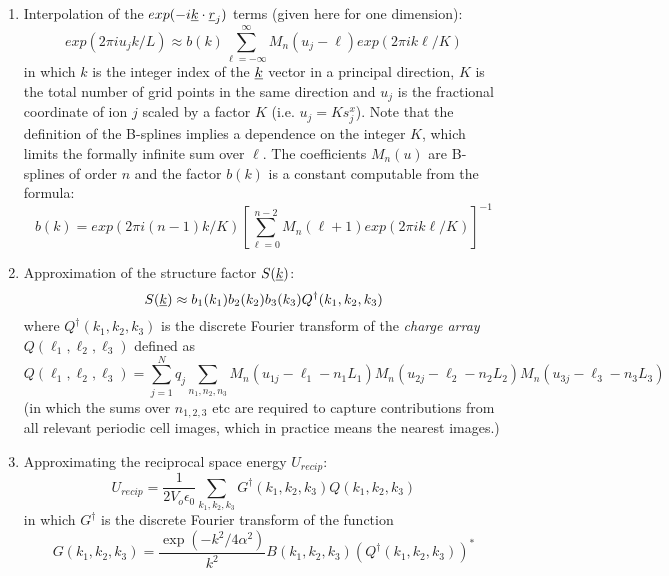 \begin{enumerate}
\item Interpolation of the $exp(-i\mbox{$\underline{k}$}\cdot\mbox{$\underline{r}$}_{j})$ terms
(given here for one dimension):
\begin{equation}
exp(2\pi i u_{j}k/L) \approx b(k)
\sum_{\ell=-\infty}^{\infty} M_{n}(u_{j}-\ell) exp(2\pi i k\ell/K)
\end{equation}
in which $k$ is the integer index of the $\mbox{$\underline{k}$}$ vector in a
principal direction, $K$ is the total number of grid points in the
same direction and $u_{j}$ is the fractional coordinate of ion $j$
scaled by a factor $K$ (i.e. $u_{j}=K s_{j}^{x}$). Note that the
definition of the B-splines implies a dependence on the integer $K$,
which limits the formally infinite sum over $\ell$.  The coefficients
$M_{n}(u)$ are B-splines of order $n$ and the factor $b(k)$ is a
constant computable from the formula:
\begin{equation}
b(k)=exp(2\pi i (n-1)k/K)\left 
[\sum_{\ell=0}^{n-2} M_{n}(\ell+1) exp(2\pi i k\ell/K)\right ]^{-1}
\end{equation}
\item Approximation of the structure factor $S(\mbox{$\underline{k}$})$:
\begin{equation}
S(\mbox{$\underline{k}$}) \approx b_{1}(k_{1}) b_{2}(k_{2}) b_{3}(k_{3})
Q^{\dagger}(k_{1},k_{2},k_{3})
\end{equation}
where $Q^{\dagger}(k_{1},k_{2},k_{3})$ is the discrete Fourier transform of
the {\em charge array} $Q(\ell_{1},\ell_{2},\ell_{3})$ defined as
\begin{equation}
Q(\ell_{1},\ell_{2},\ell_{3})=\sum_{j=1}^{N}q_{j}\sum_{n_{1},n_{2},n_{3}}
M_{n}(u_{1j}-\ell_{1}-n_{1}L_{1})
M_{n}(u_{2j}-\ell_{2}-n_{2}L_{2})
M_{n}(u_{3j}-\ell_{3}-n_{3}L_{3})
\end{equation}
(in which the sums over $n_{1,2,3}$ etc are required to capture
contributions from all relevant periodic cell images, which in
practice means the nearest images.)
\item Approximating the reciprocal space energy $U_{recip}$:
\begin{equation}
U_{recip}=\frac{1}{2V_{o}\epsilon_{0}}\sum_{k_{1},k_{2},k_{3}}
G^{\dagger}(k_{1},k_{2},k_{3})Q(k_{1},k_{2},k_{3})
\end {equation}
in which $G^{\dagger}$ is the discrete Fourier transform of the function
\begin{equation}
G(k_{1},k_{2},k_{3})=
\frac{\exp(-k^{2}/4\alpha^{2})}{k^{2}}
B(k_{1},k_{2},k_{3})
(Q^{\dagger}(k_{1},k_{2},k_{3}))^{*}
\end{equation}

\end{enumerate}

